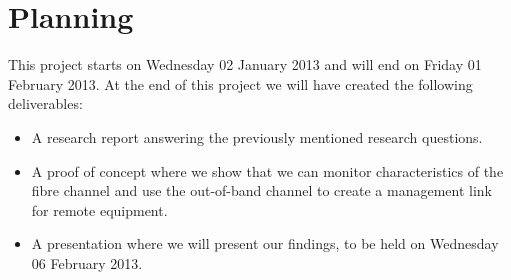 \documentclass{article}
\begin{document}
\section{Planning}
This project starts on Wednesday 02 January 2013 and will end on Friday 01 February 2013. 
At the end of this project we will have created the following deliverables:
\begin{itemize}
\item A research report answering the previously mentioned research questions.
\item A proof of concept where we show that we can monitor characteristics of the fibre channel and use the out-of-band channel to create a management link for remote equipment.
\item A presentation where we will present our findings, to be held on Wednesday 06 February 2013.
\end{itemize}
\end{document}
